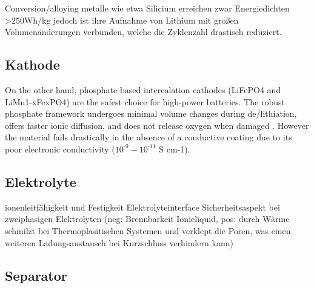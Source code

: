 

Conversion/alloying metalle wie etwa Silicium erreichen zwar Energiedichten >250Wh/kg jedoch ist ihre Aufnahme von Lithium mit großen Volumenänderungen verbunden, welche die Zyklenzahl drastisch reduziert.

\subsection{Kathode}

On the other hand, phosphate-based intercalation cathodes (LiFePO4 and LiMn1-xFexPO4) are the safest choice for high-power batteries. The robust phosphate framework undergoes minimal volume changes during de/lithiation, offers faster ionic diffusion, and does not release oxygen when damaged \cite{Ling2021}. However the material fails drastically in the absence of a conductive coating due to its poor electronic conductivity ($10^{\text{-}9}-10^{\text{-}11}$ S cm-1).

\subsection{Elektrolyte}
ionenleitfähigkeit und Festigkeit
Elektrolyteinterface
Sicherheitsaspekt bei zweiphasigen Elektrolyten (neg: Brennbarkeit Ionicliquid, pos: durch Wärme schmilzt bei Thermoplasitischen Systemen und verklept die Poren, was einen weiteren Ladungsaustausch bei Kurzschluss verhindern kann)
\subsection{Separator}




